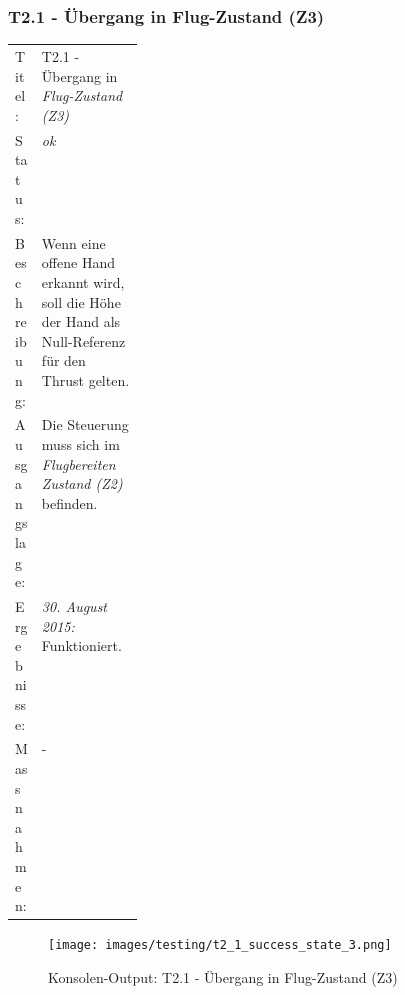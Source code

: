 \subsubsection{T2.1 - Übergang in Flug-Zustand (Z3)}
\begin{table}[H]
	\centering
	\small\renewcommand{\arraystretch}{1.4}
	\begin{tabularx}{0.9\textwidth}{ L{0.15\linewidth} | X  }%
		\hline
		Titel: & T2.1 - Übergang in \textit{Flug-Zustand (Z3)}\\
		Status: & \textit{ok}\\
		Beschreibung: &  Wenn eine offene Hand erkannt wird, soll die Höhe der Hand als Null-Referenz für den Thrust gelten.
		\\
		Ausgangslage: & Die Steuerung muss sich im \textit{Flugbereiten Zustand (Z2)} befinden.\\
		Ergebnisse: & \textit{30. August 2015:}
		Funktioniert.
		\\
		Massnahmen: & -\\
		\hline
	\end{tabularx}
\end{table}
\begin{figure}[H]
	\centering
	\texttt{[image: images/testing/t2\_1\_success\_state\_3.png]}
	\caption{Konsolen-Output: T2.1 - Übergang in Flug-Zustand (Z3)}
	\vspace{-1\baselineskip}
\end{figure}

\newpage
